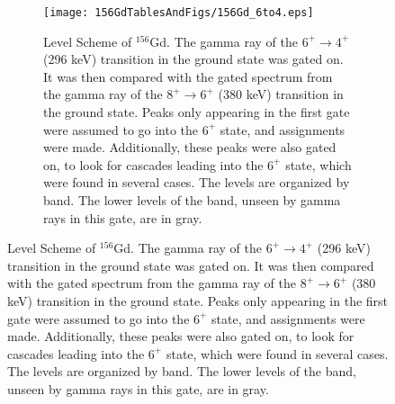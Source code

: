 \begin{landscape}
\begin{figure}[!]
    \centering
    \begin{subfigure}{1.4\textwidth}
    \texttt{[image: 156GdTablesAndFigs/156Gd\_6to4.eps]}
    \caption{\label{fig:156_6to4level}Level Scheme of $^{156}$Gd. The gamma ray of the $6^+\rightarrow4^+$ (296 keV) transition in the ground state was gated on. It was then compared with the gated spectrum from the gamma ray of the $8^+\rightarrow6^+$ (380 keV) transition in the ground state. Peaks only appearing in the first gate were assumed to go into the $6^+$ state, and assignments were made. Additionally, these peaks were also gated on, to look for cascades leading into the $6^+$ state, which were found in several cases. The levels are organized by band. The lower levels of the band, unseen by gamma rays in this gate, are in gray.}
    \end{subfigure}
    \label{fig:156_6to4}
    \end{figure}
    \end{landscape}
